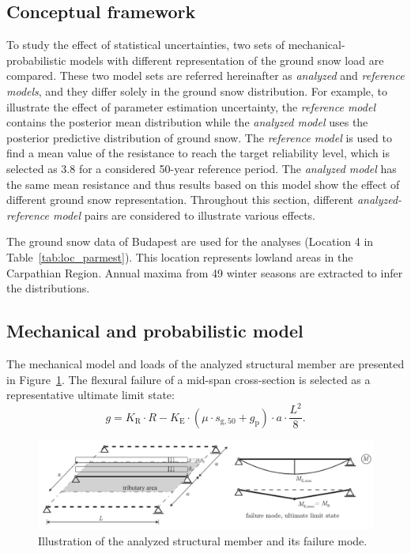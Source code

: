 \subsection{Conceptual framework}
To study the effect of statistical uncertainties, two sets of mechanical-probabilistic models with different representation of the ground snow load are compared. These two model sets are referred hereinafter as \textit{analyzed} and \textit{reference models}, and they differ solely in the ground snow distribution. For example, to illustrate the effect of parameter estimation uncertainty, the \textit{reference model} contains the posterior mean distribution while the \textit{analyzed model} uses the posterior predictive distribution of ground snow. The \textit{reference model} is used to find a mean value of the resistance to reach the target reliability level, which is selected as 3.8 for a considered 50-year reference period. The \textit{analyzed model} has the same mean resistance and thus results based on this model show the effect of different ground snow representation. Throughout this section, different \textit{analyzed-reference model} pairs are considered to illustrate various effects.

The ground snow data of Budapest are used for the analyses (Location 4 in Table~\ref{tab:loc_parmest}). This location  represents lowland areas in the Carpathian Region. Annual maxima from 49 winter seasons are extracted to infer the distributions.

\subsection{Mechanical and probabilistic model} 

The mechanical model and loads of the analyzed structural member are presented in Figure~\ref{fig:beam_illustration}. The flexural failure of a mid-span cross-section is selected as a representative ultimate limit state:
\begin{equation}
	g = {K_{\mathrm{R}}} \cdot R - {K_{\mathrm{E}}} \cdot \left( {\mu  \cdot {s_{{\mathrm{g,50}}}} + {g_{\mathrm{p}}}} \right) \cdot a \cdot \frac{{{L^2}}}{8}.
\end{equation}

\begin{figure}[htbp!]
	\centering    
	\includegraphics[width = 1\textwidth]{beam_illustration.pdf}
	\caption{Illustration of the analyzed structural member and its failure mode.}
	\label{fig:beam_illustration}
\end{figure}

